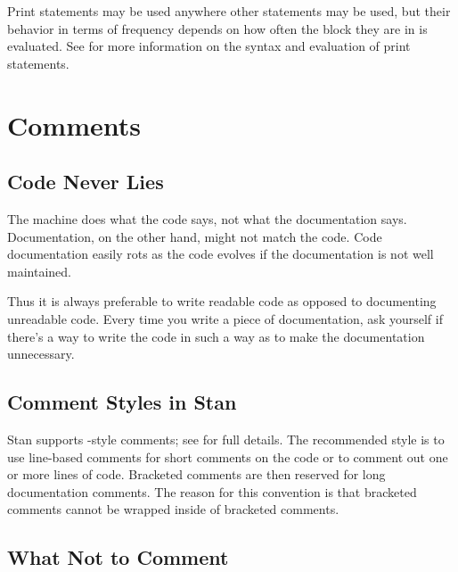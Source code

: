 Print statements may be used anywhere other statements may be used,
but their behavior in terms of frequency depends on how often the
block they are in is evaluated.  See  for
more information on the syntax and evaluation of print statements.



\section{Comments}\label{comments-programming.section}

\subsection{Code Never Lies}

The machine does what the code says, not what the documentation says.
Documentation, on the other hand, might not match the code.  Code
documentation easily rots as the code evolves if the documentation is
not well maintained.  

Thus it is always preferable to write readable code as opposed to
documenting unreadable code.  Every time you write a piece of
documentation, ask yourself if there's a way to write the code in such
a way as to make the documentation unnecessary.


\subsection{Comment Styles in Stan}

Stan supports \Cpp-style comments; see  for full
details.  The recommended style is to use line-based comments for
short comments on the code or to comment out one or more
lines of code.  Bracketed comments are then reserved for long
documentation comments.  The reason for this convention is that
bracketed comments cannot be wrapped inside of bracketed comments.

\subsection{What Not to Comment}

